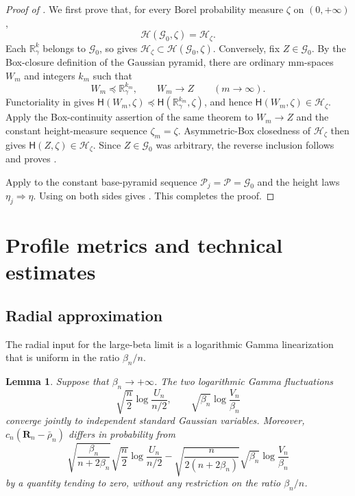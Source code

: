 \documentclass[10pt,a4paper]{amsart}
\numberwithin{equation}{section}
\newtheorem{lemma}[theorem]{Lemma}
\begin{document}
\begin{proof}[Proof of ]
We first prove that, for every Borel probability measure $\zeta$ on $(0,+\infty)$,
\begin{equation}\label{eq:Gaussian-base-joint-specialization}
 \mathcal H(\mathcal G_0,\zeta)=\mathcal H_\zeta.
\end{equation}
Each $\mathbb R_\gamma^k$ belongs to $\mathcal G_0$, so
 gives
$\mathcal H_\zeta\subset\mathcal H(\mathcal G_0,\zeta)$.  Conversely, fix $Z\in\mathcal G_0$.  By the Box-closure
definition of the Gaussian pyramid, there are ordinary mm-spaces $W_m$ and integers $k_m$ such that
\[
 W_m\preceq\mathbb R_\gamma^{k_m},
 \qquad
 W_m\longrightarrow Z
 \qquad(m\to\infty).
\]
Functoriality in  gives
$\mathsf H(W_m,\zeta)\preceq\mathsf H(\mathbb R_\gamma^{k_m},\zeta)$, and hence
$\mathsf H(W_m,\zeta)\in\mathcal H_\zeta$.  Apply the Box-continuity assertion of the same theorem to
$W_m\to Z$ and the constant height-measure sequence $\zeta_m=\zeta$.  Asymmetric-Box closedness of
$\mathcal H_\zeta$ then gives $\mathsf H(Z,\zeta)\in\mathcal H_\zeta$.  Since $Z\in\mathcal G_0$ was arbitrary,
the reverse inclusion follows and proves .

Apply  to the constant base-pyramid sequence
$\mathcal P_j=\mathcal P=\mathcal G_0$ and the height laws $\eta_j\Rightarrow\eta$.  Using
 on both sides gives
.  This completes the proof.
\end{proof}

\section{Profile metrics and technical estimates}\label{app:profile-estimates}

\subsection{Radial approximation}

The radial input for the large-beta limit is a logarithmic Gamma linearization that is uniform in the ratio $\beta_n/n$.

\begin{lemma}\label{lem:radial-linearization}
Suppose that $\beta_n\to+\infty$.  The two logarithmic Gamma fluctuations
\[ \sqrt{\frac n2}\log\frac{U_n}{n/2}, \qquad \sqrt{\beta_n}\log\frac{V_n}{\beta_n} \]
converge jointly to independent standard Gaussian variables.  Moreover,
$c_n(\mathbf R_n-\bar\rho_n)$ differs in probability from
\begin{equation}\label{eq:radial-linear-part} \sqrt{\frac{\beta_n}{n+2\beta_n}} \sqrt{\frac n2}\log\frac{U_n}{n/2} -\sqrt{\frac{n}{2(n+2\beta_n)}} \sqrt{\beta_n}\log\frac{V_n}{\beta_n} \end{equation}
by a quantity tending to zero, without any restriction on the ratio $\beta_n/n$.
\end{lemma}
\end{document}

